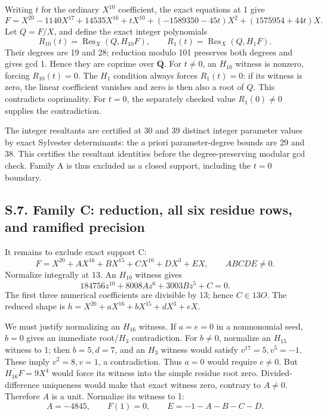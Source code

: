 \documentclass[
  british,
  10pt,
]{article}
\begin{document}
Writing \(t\) for the ordinary \(X^{10}\) coefficient, the exact
equations at 1 give \[
F=X^{20}-1140X^{17}+14535X^{16}+tX^{10}
  +(-1589350-45t)X^2+(1575954+44t)X.
\tag{S13}
\] Let \(Q=F/X\), and define the exact integer polynomials \[
R_{10}(t)=\operatorname{Res}_X(Q,H_{10}F),\qquad
R_1(t)=\operatorname{Res}_X(Q,H_1F).
\] Their degrees are 19 and 28; reduction modulo 101 preserves both
degrees and gives gcd 1. Hence they are coprime over \(\mathbf Q\). For
\(t\ne0\), an \(H_{10}\) witness is nonzero, forcing \(R_{10}(t)=0\).
The \(H_1\) condition always forces \(R_1(t)=0\): if its witness is
zero, the linear coefficient vanishes and zero is then also a root of
\(Q\). This contradicts coprimality. For \(t=0\), the separately checked
value \(R_1(0)\ne0\) supplies the contradiction.

The integer resultants are certified at 30 and 39 distinct integer
parameter values by exact Sylvester determinants: the a priori
parameter-degree bounds are 29 and 38. This certifies the resultant
identities before the degree-preserving modular gcd check. Family A is
thus excluded as a closed support, including the \(t=0\) boundary.

\subsection{S.7. Family C: reduction, all six residue rows, and ramified
precision}\label{s.7.-family-c-reduction-all-six-residue-rows-and-ramified-precision}

It remains to exclude exact support C: \[
F=X^{20}+AX^{16}+BX^{15}+CX^{10}+DX^3+EX,
\qquad ABCDE\ne0.
\tag{S14}
\] Normalize integrally at 13. An \(H_{10}\) witness gives \[
184756z^{10}+8008Az^6+3003Bz^5+C=0.
\] The first three numerical coefficients are divisible by 13; hence
\(C\in13O\). The reduced shape is \(h=X^{20}+aX^{16}+bX^{15}+dX^3+eX\).

We must justify normalizing an \(H_{16}\) witness. If \(a=e=0\) in a
nonmonomial seed, \(b=0\) gives an immediate root/\(H_3\) contradiction.
For \(b\ne0\), normalize an \(H_{15}\) witness to 1; then \(b=5,d=7\),
and an \(H_3\) witness would satisfy \(v^{17}=5,v^5=-1\). These imply
\(v^2=8,v=1\), a contradiction. Thus \(a=0\) would require \(e\ne0\).
But \(\overline{H_{16}F}=9X^4\) would force its witness into the simple
residue root zero. Divided-difference uniqueness would make that exact
witness zero, contrary to \(A\ne0\). Therefore \(A\) is a unit.
Normalize its witness to 1: \[
A=-4845,\qquad F(1)=0,\qquad E=-1-A-B-C-D.
\tag{S15}
\]
\end{document}

